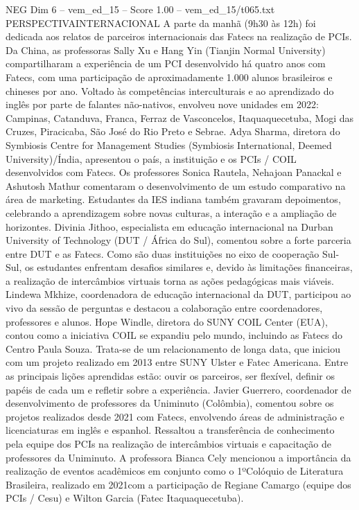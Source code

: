 \begin{textsample}{NEG Dim 6 – vem\_ed\_15 – Score 1.00 – vem\_ed\_15/t065.txt}  \label{ex:f6_neg_140}
PERSPECTIVAINTERNACIONAL A parte da manhã (9h30 às 12h) foi dedicada aos relatos de parceiros internacionais das Fatecs na realização de PCIs.
Da China, as professoras Sally Xu e Hang Yin (Tianjin Normal University) compartilharam a experiência de um PCI desenvolvido há quatro anos com Fatecs, com uma participação de aproximadamente 1.000 alunos brasileiros e chineses por ano.
Voltado às competências interculturais e ao aprendizado do inglês por parte de falantes não-nativos, envolveu nove unidades em 2022: Campinas, Catanduva, Franca, Ferraz de Vasconcelos, Itaquaquecetuba, Mogi das Cruzes, Piracicaba, São José do Rio Preto e Sebrae.
Adya Sharma, diretora do Symbiosis Centre for Management Studies (Symbiosis International, Deemed University)/Índia, apresentou o país, a instituição e os PCIs / COIL desenvolvidos com Fatecs.
Os professores Sonica Rautela, Nehajoan Panackal e Ashutosh Mathur comentaram o desenvolvimento de um estudo comparativo na área de marketing.
Estudantes da IES indiana também gravaram depoimentos, celebrando a aprendizagem sobre novas culturas, a interação e a ampliação de horizontes.
Divinia Jithoo, especialista em educação internacional na Durban University of Technology (DUT / África do Sul), comentou sobre a forte parceria entre DUT e as Fatecs.
Como são duas instituições no eixo de cooperação Sul-Sul, os estudantes enfrentam desafios similares e, devido às limitações financeiras, a realização de intercâmbios virtuais torna as ações pedagógicas mais viáveis.
Lindewa Mkhize, coordenadora de educação internacional da DUT, participou ao vivo da sessão de perguntas e destacou a colaboração entre coordenadores, professores e alunos.
Hope Windle, diretora do SUNY COIL Center (EUA), contou como a iniciativa COIL se expandiu pelo mundo, incluindo as Fatecs do Centro Paula Souza.
Trata-se de um relacionamento de longa data, que iniciou com um projeto realizado em 2013 entre SUNY Ulster e Fatec Americana.
Entre as principais lições aprendidas estão: ouvir os parceiros, ser flexível, definir os papéis de cada um e refletir sobre a experiência.
Javier Guerrero, coordenador de desenvolvimento de professores da Uniminuto (Colômbia), comentou sobre os projetos realizados desde 2021 com Fatecs, envolvendo áreas de administração e licenciaturas em inglês e espanhol.
Ressaltou a transferência de conhecimento pela equipe dos PCIs na realização de intercâmbios virtuais e capacitação de professores da Uniminuto.
A professora Bianca Cely mencionou a importância da realização de eventos acadêmicos em conjunto como o 1ºColóquio de Literatura Brasileira, realizado em 2021com a participação de Regiane Camargo (equipe dos PCIs / Cesu) e Wilton Garcia (Fatec Itaquaquecetuba).

\end{textsample}
